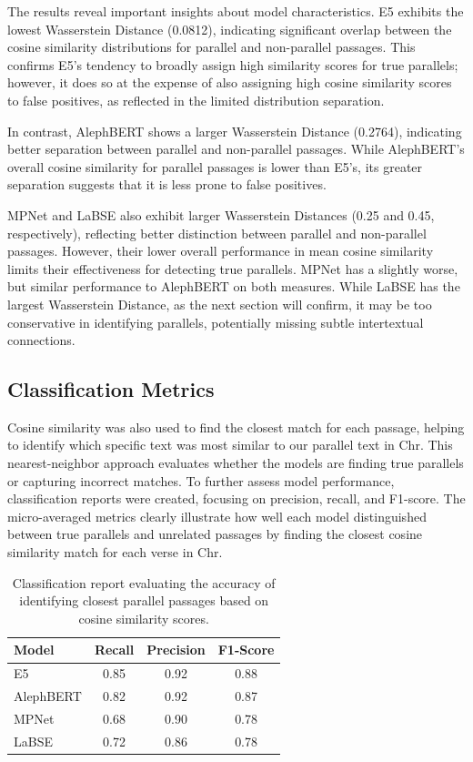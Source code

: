 \documentclass[12pt]{article}
\begin{document}
The results reveal important insights about model characteristics. E5 exhibits the lowest Wasserstein Distance (0.0812), indicating significant overlap between the cosine similarity distributions for parallel and non-parallel passages. This confirms E5's tendency to broadly assign high similarity scores for true parallels; however, it does so at the expense of also assigning high cosine similarity scores to false positives, as reflected in the limited distribution separation.

In contrast, AlephBERT shows a larger Wasserstein Distance (0.2764), indicating better separation between parallel and non-parallel passages. While AlephBERT's overall cosine similarity for parallel passages is lower than E5's, its greater separation suggests that it is less prone to false positives.

MPNet and LaBSE also exhibit larger Wasserstein Distances (0.25 and 0.45, respectively), reflecting better distinction between parallel and non-parallel passages. However, their lower overall performance in mean cosine similarity limits their effectiveness for detecting true parallels. MPNet has a slightly worse, but similar performance to AlephBERT on both measures. While LaBSE has the largest Wasserstein Distance, as the next section will confirm, it may be too conservative in identifying parallels, potentially missing subtle intertextual connections.

\subsection{Classification Metrics}
Cosine similarity was also used to find the closest match for each passage, helping to identify which specific text was most similar to our parallel text in Chr. This nearest-neighbor approach evaluates whether the models are finding true parallels or capturing incorrect matches. To further assess model performance, classification reports were created, focusing on precision, recall, and F1-score. The micro-averaged metrics \cite{Rainio} clearly illustrate how well each model distinguished between true parallels and unrelated passages by finding the closest cosine similarity match for each verse in Chr.

\begin{table}[htbp]
\centering
\label{tab:classification}
\begin{tabular}{@{}lccc@{}}
\toprule
\textbf{Model} & \textbf{Recall} & \textbf{Precision} & \textbf{F1-Score} \\ 
\midrule
E5         & 0.85 & 0.92 & 0.88 \\
AlephBERT  & 0.82 & 0.92 & 0.87 \\
MPNet      & 0.68 & 0.90 & 0.78 \\
LaBSE      & 0.72 & 0.86 & 0.78 \\
\bottomrule
\end{tabular}
\caption{Classification report evaluating the accuracy of identifying closest parallel passages based on cosine similarity scores.}
\end{table}
\end{document}
